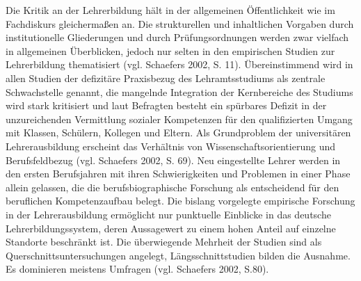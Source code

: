 \documentclass[12pt,a4paper]{article}
\begin{document}
Die Kritik an der Lehrerbildung hält in der allgemeinen Öffentlichkeit wie im Fachdiskurs gleichermaßen an. Die strukturellen und inhaltlichen Vorgaben durch institutionelle Gliederungen und durch Prüfungsordnungen werden zwar vielfach in allgemeinen Überblicken, jedoch nur selten in den empirischen Studien zur Lehrerbildung thematisiert (vgl. Schaefers 2002, S. 11)\cite{Christine2002}.
Übereinstimmend wird in allen Studien der defizitäre Praxisbezug des Lehramtsstudiums als zentrale Schwachstelle genannt, die mangelnde Integration der Kernbereiche des Studiums wird stark kritisiert und laut Befragten besteht ein spürbares Defizit in der unzureichenden Vermittlung sozialer Kompetenzen für den qualifizierten Umgang mit Klassen, Schülern, Kollegen und Eltern. Als Grundproblem der universitären Lehrerausbildung erscheint das Verhältnis von Wissenschaftsorientierung und Berufsfeldbezug (vgl. Schaefers 2002, S. 69).
Neu eingestellte Lehrer werden in den ersten Berufsjahren mit ihren Schwierigkeiten und Problemen in einer Phase allein gelassen, die die berufsbiographische Forschung als entscheidend für den beruflichen Kompetenzaufbau belegt. Die bislang vorgelegte empirische Forschung in der Lehrerausbildung ermöglicht nur punktuelle Einblicke in das deutsche Lehrerbildungssystem, deren Aussagewert zu einem hohen Anteil auf einzelne Standorte beschränkt ist. Die überwiegende Mehrheit der Studien sind als Querschnittsuntersuchungen angelegt, Längsschnittstudien bilden die Ausnahme. Es dominieren meistens Umfragen (vgl. Schaefers 2002, S.80).
\end{document}
